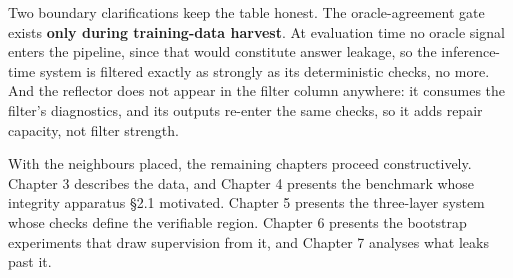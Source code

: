 Two boundary clarifications keep the table honest. The oracle-agreement gate exists \textbf{only during training-data harvest}. At evaluation time no oracle signal enters the pipeline, since that would constitute answer leakage, so the inference-time system is filtered exactly as strongly as its deterministic checks, no more. And the reflector does not appear in the filter column anywhere: it consumes the filter's diagnostics, and its outputs re-enter the same checks, so it adds repair capacity, not filter strength.

With the neighbours placed, the remaining chapters proceed constructively. Chapter 3 describes the data, and Chapter 4 presents the benchmark whose integrity apparatus §2.1 motivated. Chapter 5 presents the three-layer system whose checks define the verifiable region. Chapter 6 presents the bootstrap experiments that draw supervision from it, and Chapter 7 analyses what leaks past it.
